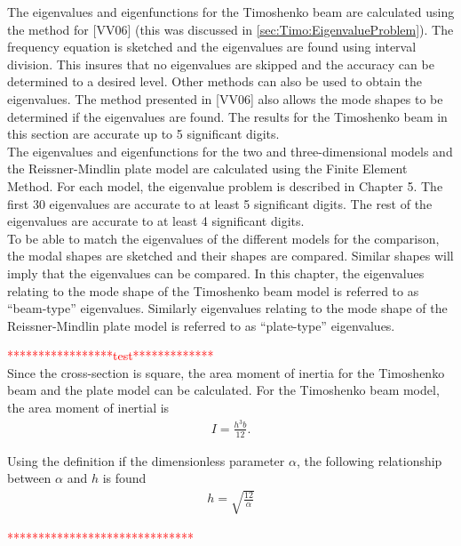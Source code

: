 \documentclass[../main.tex]{subfiles}
\begin{document}
The eigenvalues and eigenfunctions for the Timoshenko beam are calculated using the method for [VV06] (this was discussed in \ref{sec:Timo:EigenvalueProblem}). The frequency equation is sketched and the eigenvalues are found using interval division. This insures that no eigenvalues are skipped and the accuracy can be determined to a desired level. Other methods can also be used to obtain the eigenvalues. The method presented in [VV06] also allows the mode shapes to be determined if the eigenvalues are found. The results for the Timoshenko beam in this section are accurate up to 5 significant digits.\\

The eigenvalues and eigenfunctions for the two and three-dimensional models and the Reissner-Mindlin plate model are calculated using the Finite Element Method. For each model, the eigenvalue problem is described in Chapter 5. The first 30 eigenvalues are accurate to at least 5 significant digits. The rest of the eigenvalues are accurate to at least 4 significant digits.\\

To be able to match the eigenvalues of the different models for the comparison, the modal shapes are sketched and their shapes are compared. Similar shapes will imply that the eigenvalues can be compared. In this chapter, the eigenvalues relating to the mode shape of the Timoshenko beam model is referred to as ``beam-type'' eigenvalues. Similarly eigenvalues relating to the mode shape of the Reissner-Mindlin plate model is referred to as ``plate-type'' eigenvalues.

\textcolor{red}{*****************test*************}\\
Since the cross-section is square, the area moment of inertia for the Timoshenko beam and the plate model can be calculated. For the Timoshenko beam model, the area moment of inertial is 
\begin{eqnarray*}
	I = \frac{h^3b}{12}.
\end{eqnarray*}

Using the definition if the dimensionless parameter $\alpha$, the following relationship between $\alpha$ and $h$ is found
\begin{eqnarray*}
	h = \sqrt{\frac{12}{\alpha}}
\end{eqnarray*}

\textcolor{red}{******************************}
\end{document}
